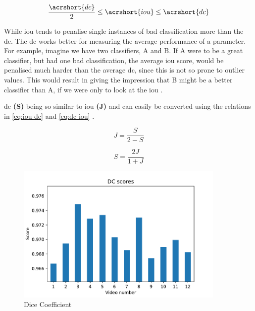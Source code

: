 \begin{equation}\label{eq:dc_iou_relation}
    \frac{\acrshort{dc}}{2} \leq \acrshort{iou} \leq \acrshort{dc}
\end{equation}

While \acrlong{iou} tends to penalise single instances of bad classification more than the \acrlong{dc}. The \acrlong{dc} works better for measuring the average performance of a parameter. For example, imagine we have two classifiers, A and B. If A were to be a great classifier, but had one bad classification, the average \acrlong{iou} score, would be penalised much harder than the average \acrlong{dc}, since this is not so prone to outlier values. This would result in giving the impression that B might be a better classifier than A, if we were only to look at the \acrlong{iou} \cite{276144}.

\acrlong{dc} \textbf{(S)} being so similar to \acrlong{iou} \textbf{(J)} and can easily be converted using the relations in \autoref{eq:iou-dc} and \autoref{eq:dc-iou} \cite{wiki_dc}.

\begin{minipage}{.45\linewidth}
\begin{equation}\label{eq:iou-dc}
    J = \frac{S}{2 - S}
\end{equation}
\end{minipage}
\begin{minipage}{.45\linewidth}
\begin{equation}\label{eq:dc-iou}
    S = \frac{2J}{1 + J}
\end{equation}
\end{minipage}

\begin{figure}[H]
  \centering
  \includegraphics[width=0.9\textwidth]{img/objective_measures/dc.pdf}
  \caption{Dice Coefficient}
  \label{fig:dc}
\end{figure}